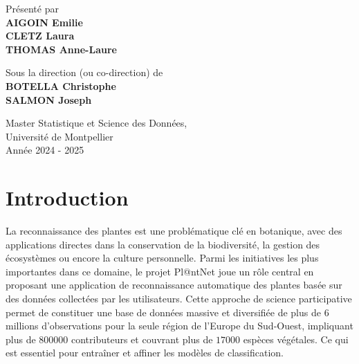 \documentclass[a4paper,12pt]{article}
\begin{document}
\vfill
\begin{center}
Présenté par \\ \vspace{0.2cm}
    {\textbf{AIGOIN Emilie \\ \vspace{0.1cm} CLETZ Laura \\ \vspace{0.1cm} THOMAS Anne-Laure}}\\ \vspace{0.6cm}
    
Sous la direction (ou co-direction) de \\ \vspace{0.2cm}
    {\textbf{BOTELLA Christophe \\ \vspace{0.1cm} SALMON Joseph }}\\ \vspace{1.5cm}
    
    {\large Master Statistique et Science des Données, \\ \vspace{0.1cm} Université de Montpellier}\\ \vspace{0.6cm}
    {\large Année 2024 - 2025}
\end{center}

\thispagestyle{empty}

\newpage

\tableofcontents 

\newpage


\section{Introduction}

La reconnaissance des plantes est une problématique clé en botanique, avec des applications directes dans la conservation de la biodiversité, la gestion des écosystèmes ou encore la culture personnelle. Parmi les initiatives les plus importantes dans ce domaine, le projet Pl@ntNet joue un rôle central en proposant une application de reconnaissance automatique des plantes basée sur des données collectées par les utilisateurs. Cette approche de science participative permet de constituer une base de données massive et diversifiée de plus de $6$ millions d'observations pour la seule région de l'Europe du Sud-Ouest, impliquant plus de $\num{800000}$ contributeurs et couvrant plus de $\num{17000}$ espèces végétales. Ce qui est essentiel pour entraîner et affiner les modèles de classification.
\end{document}
